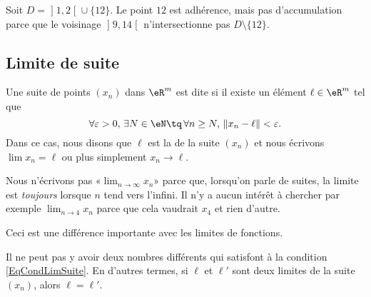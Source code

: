 \begin{example}     \label{EXooWOYQooJolaTV}
	Soit \( D=\mathopen] 1 , 2 \mathclose[\cup\{ 12 \}\). Le point \( 12\) est adhérence, mais pas d'accumulation parce que le voisinage \( \mathopen] 9 , 14 \mathclose[\) n'intersectionne pas \( D\setminus \{ 12 \}\).
\end{example}

\subsection{Limite de suite}

\begin{definition}
	Une suite de points \( (x_n)\) dans \( \eR^m\) est dite  si il existe un élément \( \ell\in\eR^m\) tel que
	\begin{equation}	\label{EqCondLimSuite}
		\forall\varepsilon>0,\,\exists N\in \eN\tq\,\forall n\geq N,\,\| x_n-\ell \|<\varepsilon.
	\end{equation}
	Dans ce cas, nous disons que \( \ell\) est la  de la suite \( (x_n)\) et nous écrivons \( \lim x_n=\ell\) ou plus simplement \( x_n\to \ell\).
\end{definition}

\begin{remark}
	Nous n'écrivons pas «\( \lim_{n\to\infty}x_n\)» parce que, lorsqu'on parle de suites, la limite est \emph{toujours} lorsque \( n\) tend vers l'infini. Il n'y a aucun intérêt à chercher par exemple \( \lim_{n\to 4}x_n\) parce que cela vaudrait \( x_4\) et rien d'autre.

	Ceci est une différence importante avec les limites de fonctions.
\end{remark}

\begin{lemma}
	Il ne peut pas y avoir deux nombres différents qui satisfont à la condition \eqref{EqCondLimSuite}. En d'autres termes, si \( \ell\) et \( \ell'\) sont deux limites de la suite \( (x_n)\), alors \( \ell=\ell'\).
\end{lemma}

